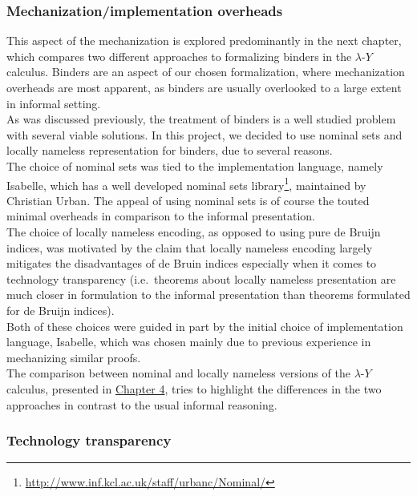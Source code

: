 \documentclass[a4paper, 12pt, twoside]{style/ociamthesis}
\theoremstyle{plain}
\theoremstyle{definition}
\theoremstyle{remark}
\renewcommand{\href}[2]{#2\footnote{\url{#1}}}
\newcommand{\lamy}{\lambda\text{-}Y}
\begin{document}
\subsubsection{Mechanization/implementation
overheads}\label{mechanizationimplementation-overheads}

This aspect of the mechanization is explored predominantly in the next
chapter, which compares two different approaches to formalizing binders
in the \(\lamy\) calculus. Binders are an aspect of our chosen
formalization, where mechanization overheads are most apparent, as
binders are usually overlooked to a large extent in informal setting.\\
As was discussed previously, the treatment of binders is a well studied
problem with several viable solutions. In this project, we decided to
use nominal sets and locally nameless representation for binders, due to
several reasons.\\
The choice of nominal sets was tied to the implementation language,
namely Isabelle, which has a well developed
\href{http://www.inf.kcl.ac.uk/staff/urbanc/Nominal/}{nominal sets
library}, maintained by Christian Urban. The appeal of using nominal
sets is of course the touted minimal overheads in comparison to the
informal presentation.\\
The choice of locally nameless encoding, as opposed to using pure de
Bruijn indices, was motivated by the claim that locally nameless
encoding largely mitigates the disadvantages of de Bruin indices
especially when it comes to technology transparency (i.e.~theorems about
locally nameless presentation are much closer in formulation to the
informal presentation than theorems formulated for de Bruijn indices).\\
Both of these choices were guided in part by the initial choice of
implementation language, Isabelle, which was chosen mainly due to
previous experience in mechanizing similar proofs.\\
The comparison between nominal and locally nameless versions of the
\(\lamy\) calculus, presented in \protect\hyperlink{comp-isa}{Chapter
4}, tries to highlight the differences in the two approaches in contrast
to the usual informal reasoning.

\subsubsection{Technology transparency}\label{technology-transparency}
\end{document}
